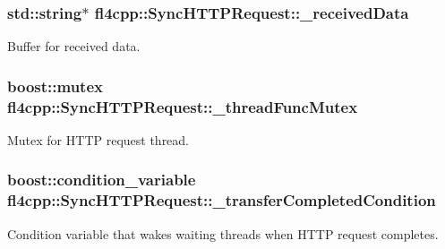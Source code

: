 \subsubsection[{\texorpdfstring{\+\_\+received\+Data}{_receivedData}}]{\setlength{\rightskip}{0pt plus 5cm}std\+::string$\ast$ fl4cpp\+::\+Sync\+H\+T\+T\+P\+Request\+::\+\_\+received\+Data\hspace{0.3cm}{\ttfamily [protected]}}\hypertarget{classfl4cpp_1_1_sync_h_t_t_p_request_a0afa54adedad41661cde551903693272}{}\label{classfl4cpp_1_1_sync_h_t_t_p_request_a0afa54adedad41661cde551903693272}
Buffer for received data. 
\subsubsection[{\texorpdfstring{\+\_\+thread\+Func\+Mutex}{_threadFuncMutex}}]{\setlength{\rightskip}{0pt plus 5cm}boost\+::mutex fl4cpp\+::\+Sync\+H\+T\+T\+P\+Request\+::\+\_\+thread\+Func\+Mutex\hspace{0.3cm}{\ttfamily [protected]}}\hypertarget{classfl4cpp_1_1_sync_h_t_t_p_request_a35729eb46c120fe754671cc36528780e}{}\label{classfl4cpp_1_1_sync_h_t_t_p_request_a35729eb46c120fe754671cc36528780e}
Mutex for H\+T\+TP request thread. 
\subsubsection[{\texorpdfstring{\+\_\+transfer\+Completed\+Condition}{_transferCompletedCondition}}]{\setlength{\rightskip}{0pt plus 5cm}boost\+::condition\+\_\+variable fl4cpp\+::\+Sync\+H\+T\+T\+P\+Request\+::\+\_\+transfer\+Completed\+Condition\hspace{0.3cm}{\ttfamily [protected]}}\hypertarget{classfl4cpp_1_1_sync_h_t_t_p_request_a92b9f168ac3b64dda81f7c54a954ead2}{}\label{classfl4cpp_1_1_sync_h_t_t_p_request_a92b9f168ac3b64dda81f7c54a954ead2}
Condition variable that wakes waiting threads when H\+T\+TP request completes. 
